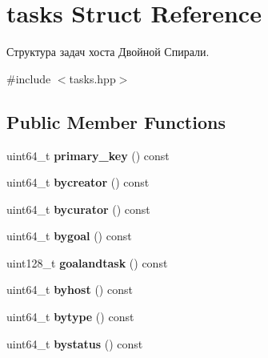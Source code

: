 \hypertarget{structtasks}{}\section{tasks Struct Reference}
\label{structtasks}


Структура задач хоста Двойной Спирали.  




{\ttfamily \#include $<$tasks.\+hpp$>$}

\subsection*{Public Member Functions}
\begin{DoxyCompactItemize}
\item 
\mbox{\label{structtasks_aeaa5ac6f325d5b6935371bcf755cfa86}} 
uint64\+\_\+t {\bfseries primary\+\_\+key} () const
\item 
\mbox{\label{structtasks_ad22f7c4144514d643e926903ef620ddd}} 
uint64\+\_\+t {\bfseries bycreator} () const
\item 
\mbox{\label{structtasks_a7890689f0ecd517df7bb7af23319a8e3}} 
uint64\+\_\+t {\bfseries bycurator} () const
\item 
\mbox{\label{structtasks_a8e8f40da24535f25d0de8c3f7b99f5a7}} 
uint64\+\_\+t {\bfseries bygoal} () const
\item 
\mbox{\label{structtasks_a19e89234fbbec30d0358446e8e5c7360}} 
uint128\+\_\+t {\bfseries goalandtask} () const
\item 
\mbox{\label{structtasks_a40ece529ad989cfbc7c8930a102e37e6}} 
uint64\+\_\+t {\bfseries byhost} () const
\item 
\mbox{\label{structtasks_aa51c0c51b966fa5274a4249246573650}} 
uint64\+\_\+t {\bfseries bytype} () const
\item 
\mbox{\label{structtasks_a7682fe8e8e3a3579713420f9523c0f72}} 
uint64\+\_\+t {\bfseries bystatus} () const
\item 
\mbox{\label{structtasks_ad184b97d2cff31b025d05e1253044e4d}} 

\end{DoxyCompactItemize}
